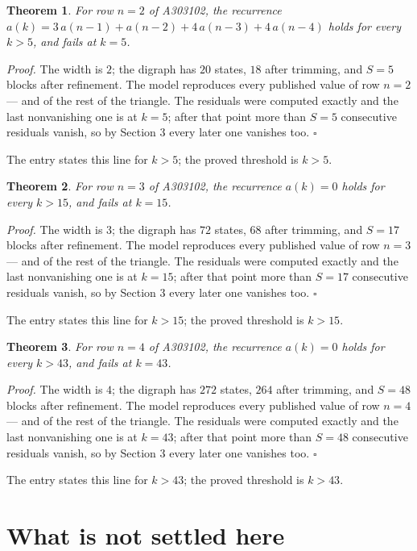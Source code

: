\documentclass[11pt]{article}
\newtheorem{theorem}{Theorem}
\theoremstyle{definition}
\begin{document}
\begin{theorem} For row $n = 2$ of A303102, the recurrence $a(k) = 3\,a(n-1) + a(n-2) + 4\,a(n-3) + 4\,a(n-4)$ holds for every $k > 5$, and fails at $k = 5$.\end{theorem}

{\itshape Proof.} The width is $2$; the digraph has $20$ states, $18$ after trimming, and $S = 5$ blocks after refinement. The model reproduces every published value of row $n = 2$ --- and of the rest of the triangle. The residuals were computed exactly and the last nonvanishing one is at $k = 5$; after that point more than $S = 5$ consecutive residuals vanish, so by Section 3 every later one vanishes too. $\square$

The entry states this line for $k > 5$; the proved threshold is $k > 5$.

\begin{theorem} For row $n = 3$ of A303102, the recurrence $a(k) = 0$ holds for every $k > 15$, and fails at $k = 15$.\end{theorem}

{\itshape Proof.} The width is $3$; the digraph has $72$ states, $68$ after trimming, and $S = 17$ blocks after refinement. The model reproduces every published value of row $n = 3$ --- and of the rest of the triangle. The residuals were computed exactly and the last nonvanishing one is at $k = 15$; after that point more than $S = 17$ consecutive residuals vanish, so by Section 3 every later one vanishes too. $\square$

The entry states this line for $k > 15$; the proved threshold is $k > 15$.

\begin{theorem} For row $n = 4$ of A303102, the recurrence $a(k) = 0$ holds for every $k > 43$, and fails at $k = 43$.\end{theorem}

{\itshape Proof.} The width is $4$; the digraph has $272$ states, $264$ after trimming, and $S = 48$ blocks after refinement. The model reproduces every published value of row $n = 4$ --- and of the rest of the triangle. The residuals were computed exactly and the last nonvanishing one is at $k = 43$; after that point more than $S = 48$ consecutive residuals vanish, so by Section 3 every later one vanishes too. $\square$

The entry states this line for $k > 43$; the proved threshold is $k > 43$.

\section{What is not settled here}
\end{document}
